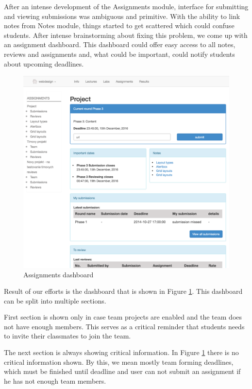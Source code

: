 After an intense development of the Assignments module, interface for submitting and viewing submissions was ambiguous and primitive. With the ability to link notes from Notes module, things started to get scattered which could confuse students. After intense brainstorming about fixing this problem, we come up with an assignment dashboard. This dashboard could offer easy access to all notes, reviews and assignments and, what could be important, could notify students about upcoming deadlines.

\begin{figure}[h]
    \centering
    \includegraphics[width=\textwidth]{images/dashboard.png}
    \caption{Assignments dashboard}
    \label{fig:assignments_dashboard}
\end{figure}

Result of our efforts is the dashboard that is shown in Figure \ref{fig:assignments_dashboard}. This dashboard can be split into multiple sections.

First section is shown only in case team projects are enabled and the team does not have enough members. This serves as a critical reminder that students needs to invite their classmates to join the team.

The next section is always showing critical information. In Figure \ref{fig:assignments_dashboard} there is no critical information shown. By this, we mean mostly team forming deadlines, which must be finished until deadline and user can not submit an assignment if he has not enough team members.

